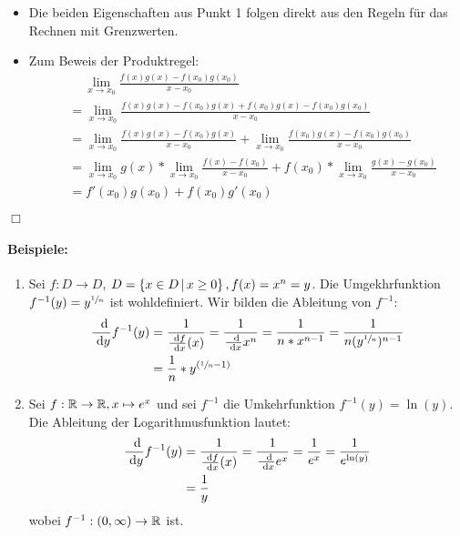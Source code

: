 \begin{beweis}
	\begin{itemize}
		\item Die beiden Eigenschaften aus Punkt 1 folgen direkt aus den Regeln für das Rechnen mit Grenzwerten.
		\item Zum Beweis der Produktregel:
		\begin{align*}
			&\quad\ \lim\limits_{x\to x_0}\frac{f(x)g(x)-f(x_0)g(x_0)}{x-x_0}\\
			&=\lim\limits_{x\to x_0}\frac{f(x)g(x)-f(x_0)g(x)+f(x_0)g(x)-f(x_0)g(x_0)}{x-x_0}\\
			&=\lim\limits_{x\to x_0}\frac{f(x)g(x)-f(x_0)g(x)}{x-x_0}+\lim\limits_{x\to x_0}\frac{f(x_0)g(x)-f(x_0)g(x_0)}{x-x_0}\\
			&=\lim\limits_{x\to x_0}g(x)*\lim\limits_{x\to x_0}\frac{f(x)-f(x_0)}{x-x_0}+f(x_0)*\lim\limits_{x\to x_0}\frac{g(x)-g(x_0)}{x-x_0}\\
			&=f'(x_0)g(x_0)+f(x_0)g'(x_0)
		\end{align*}
	\end{itemize}
	\hfill $\Box$
\end{beweis}

\paragraph{Beispiele:}
\begin{enumerate}
	\item Sei $f:D\rightarrow D$, $D=\left\{ x\in D \,\middle|\, x\geq 0 \right\}, f(x)=x^n=y$. Die Umgekhrfunktion $f^{-1}(y)=y^{\sfrac 1n}$ ist wohldefiniert. Wir bilden die Ableitung von $f^{-1}$:
	\begin{align*}
		\frac{\ \operatorname{d}\!}{\ \operatorname{d}\! y}f^{-1}(y) &= \frac{1}{\frac{\ \operatorname{d}\! f}{\ \operatorname{d}\! x}(x)}=\frac{1}{\frac{\ \operatorname{d}\!}{\ \operatorname{d}\! x}x^n}=\frac{1}{n*x^{n-1}}=\frac{1}{n(y^{\sfrac 1n})^{n-1}}\\
		&=\frac 1n*y^{(\sfrac 1n-1)}
	\end{align*}
	\item Sei $f:\mathbb{R}\rightarrow\mathbb{R},x\mapsto e^x$ und sei $f^{-1}$ die Umkehrfunktion $f^{-1}(y)=\ln(y)$. Die Ableitung der Logarithmusfunktion lautet:
	\begin{align*}
		\frac{\ \operatorname{d}\!}{\ \operatorname{d}\! y}f^{-1}(y) &= \frac{1}{\frac{\ \operatorname{d}\! f}{\ \operatorname{d}\! x}(x)}=\frac{1}{\frac{\ \operatorname{d}\!}{\ \operatorname{d}\! x}e^x}=\frac{1}{e^x}=\frac{1}{e^{\ln(y)}}\\
		&=\frac 1y
	\end{align*}
	wobei $f^{-1}:(0,\infty)\rightarrow \mathbb{R}$ ist.
\end{enumerate}

